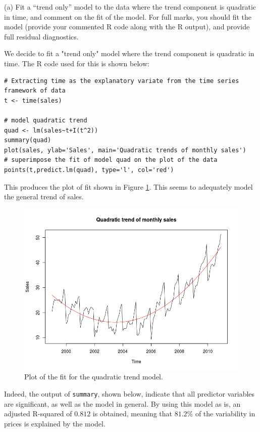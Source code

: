 \documentclass[]{article}
\begin{document}
(a) Fit a “trend only” model to the data where the trend component is quadratic in time, and comment on the fit of the model. For full marks, you should fit the model (provide your commented R code along with the R output), and provide full residual diagnostics.

\color{blue}
We decide to fit a "trend only" model where the trend component is quadratic in time. The R code used for this is shown below:

\begin{Verbatim}[frame=single]
# Extracting time as the explanatory variate from the time series framework of data
t <- time(sales)

# model quadratic trend
quad <- lm(sales~t+I(t^2))
summary(quad)
plot(sales, ylab='Sales', main='Quadratic trends of monthly sales')
# superimpose the fit of model quad on the plot of the data
points(t,predict.lm(quad), type='l', col='red')
\end{Verbatim}

This produces the plot of fit shown in Figure \ref{quad}. This seems to adequately model the general trend of sales.

\begin{figure}[!ht]
\centering
\includegraphics[width=\textwidth]{quad.png}
\caption{Plot of the fit for the quadratic trend model.}
\label{quad}
\end{figure}

Indeed, the output of \texttt{summary}, shown below, indicate that all predictor variables are significant, as well as the model in general. By using this model as is, an adjusted R-squared of $0.812$ is obtained, meaning that $81.2\%$ of the variability in prices is explained by the model.
\end{document}
